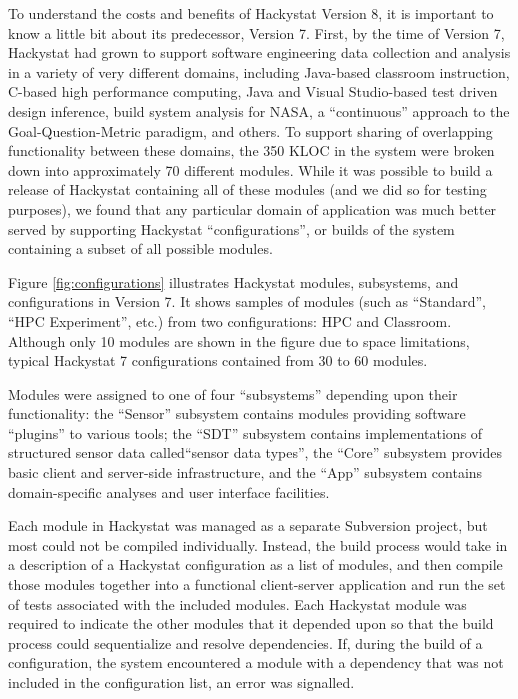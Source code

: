 \documentclass[conference,compsoc,peerreview]{IEEEtran}
\begin{document}
To understand the costs and benefits of Hackystat Version 8, it is
important to know a little bit about its predecessor, Version 7.  First, by
the time of Version 7, Hackystat had grown to support software engineering data
collection and analysis in a variety of very different domains, including
Java-based classroom instruction, C-based high performance computing, Java
and Visual Studio-based test driven design inference, build system analysis
for NASA, a ``continuous'' approach to the Goal-Question-Metric paradigm,
and others.  To support sharing of overlapping functionality between these
domains, the 350 KLOC in the system were broken down into approximately 70
different modules.  While it was possible to build a release of Hackystat
containing all of these modules (and we did so for testing purposes), we
found that any particular domain of application was much better served by
supporting Hackystat ``configurations'', or builds of the system containing
a subset of all possible modules.

Figure \ref{fig:configurations} illustrates Hackystat modules, subsystems,
and configurations in Version 7.  It shows samples of modules (such as
``Standard'', ``HPC Experiment'', etc.) from two configurations: HPC and
Classroom.  Although only 10 modules are shown in the figure due to space
limitations, typical Hackystat 7 configurations contained from 30 to 60
modules.


Modules were assigned to one of four ``subsystems'' depending upon their
functionality: the ``Sensor'' subsystem contains modules providing software
``plugins'' to various tools; the ``SDT'' subsystem contains
implementations of structured sensor data called``sensor data types'', the
``Core'' subsystem provides basic client and server-side infrastructure,
and the ``App'' subsystem contains domain-specific analyses and user
interface facilities.


Each module in Hackystat was managed as a separate Subversion project, but
most could not be compiled individually. Instead, the build process would
take in a description of a Hackystat configuration as a list of modules,
and then compile those modules together into a functional client-server
application and run the set of tests associated with the included modules.
Each Hackystat module was required to indicate the other modules that it
depended upon so that the build process could sequentialize and resolve
dependencies.  If, during the build of a configuration, the system
encountered a module with a dependency that was not included in the
configuration list, an error was signalled.
\end{document}
